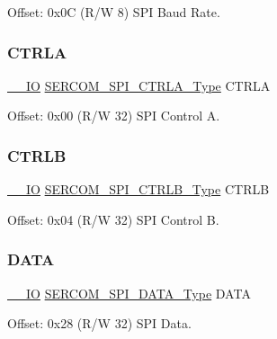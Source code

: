 Offset\+: 0x0C (R/W 8) S\+PI Baud Rate. 

\mbox{\label{struct_sercom_spi_ae4ec96c1599229f535843280c58699ef}} 
\subsubsection{\texorpdfstring{CTRLA}{CTRLA}}
{\footnotesize\ttfamily \mbox{\hyperlink{core__cm0plus_8h_aec43007d9998a0a0e01faede4133d6be}{\+\_\+\+\_\+\+IO}} \mbox{\hyperlink{union_s_e_r_c_o_m___s_p_i___c_t_r_l_a___type}{S\+E\+R\+C\+O\+M\+\_\+\+S\+P\+I\+\_\+\+C\+T\+R\+L\+A\+\_\+\+Type}} C\+T\+R\+LA}



Offset\+: 0x00 (R/W 32) S\+PI Control A. 

\mbox{\label{struct_sercom_spi_a7986bae5cd45b94105f935f0fb951356}} 
\subsubsection{\texorpdfstring{CTRLB}{CTRLB}}
{\footnotesize\ttfamily \mbox{\hyperlink{core__cm0plus_8h_aec43007d9998a0a0e01faede4133d6be}{\+\_\+\+\_\+\+IO}} \mbox{\hyperlink{union_s_e_r_c_o_m___s_p_i___c_t_r_l_b___type}{S\+E\+R\+C\+O\+M\+\_\+\+S\+P\+I\+\_\+\+C\+T\+R\+L\+B\+\_\+\+Type}} C\+T\+R\+LB}



Offset\+: 0x04 (R/W 32) S\+PI Control B. 

\mbox{\label{struct_sercom_spi_a4e619fb38ebdb89eeae0aa33acb584d1}} 
\subsubsection{\texorpdfstring{DATA}{DATA}}
{\footnotesize\ttfamily \mbox{\hyperlink{core__cm0plus_8h_aec43007d9998a0a0e01faede4133d6be}{\+\_\+\+\_\+\+IO}} \mbox{\hyperlink{union_s_e_r_c_o_m___s_p_i___d_a_t_a___type}{S\+E\+R\+C\+O\+M\+\_\+\+S\+P\+I\+\_\+\+D\+A\+T\+A\+\_\+\+Type}} D\+A\+TA}



Offset\+: 0x28 (R/W 32) S\+PI Data. 

